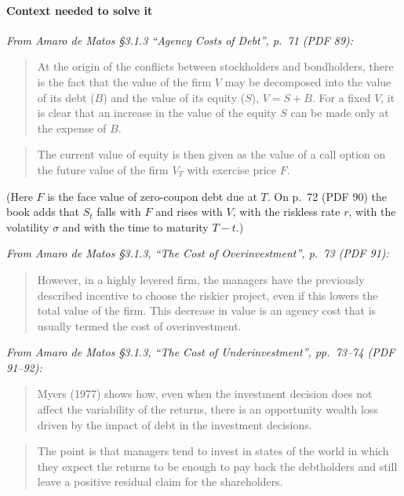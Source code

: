 \documentclass[11pt,a4paper]{article}
\begin{document}
\paragraph{Context needed to solve it}

\emph{From Amaro de Matos §3.1.3 ``Agency Costs of Debt'', p.~71 (PDF 89):}

\begin{quote}
At the origin of the conflicts between stockholders and bondholders, there is the fact that the
value of the firm \(V\) may be decomposed into the value of its debt (\(B\)) and the value of its
equity (\(S\)), \(V = S + B\). For a fixed \(V\), it is clear that an increase in the value of the
equity \(S\) can be made only at the expense of \(B\).
\end{quote}

\begin{quote}
The current value of equity is then given as the value of a call option on the future value of the
firm \(V_T\) with exercise price \(F\).
\end{quote}

(Here \(F\) is the face value of zero-coupon debt due at \(T\). On p.~72 (PDF 90) the book adds that
\(S_t\) falls with \(F\) and rises with \(V\), with the riskless rate \(r\), with the volatility
\(\sigma\) and with the time to maturity \(T-t\).)

\emph{From Amaro de Matos §3.1.3, ``The Cost of Overinvestment'', p.~73 (PDF 91):}

\begin{quote}
However, in a highly levered firm, the managers have the previously described incentive to choose
the riskier project, even if this lowers the total value of the firm. This decrease in value is an
agency cost that is usually termed the cost of overinvestment.
\end{quote}

\emph{From Amaro de Matos §3.1.3, ``The Cost of Underinvestment'', pp.~73--74 (PDF 91--92):}

\begin{quote}
Myers (1977) shows how, even when the investment decision does not affect the variability of the
returns, there is an opportunity wealth loss driven by the impact of debt in the investment
decisions.
\end{quote}

\begin{quote}
The point is that managers tend to invest in states of the world in which they expect the returns to
be enough to pay back the debtholders and still leave a positive residual claim for the
shareholders.
\end{quote}
\end{document}
